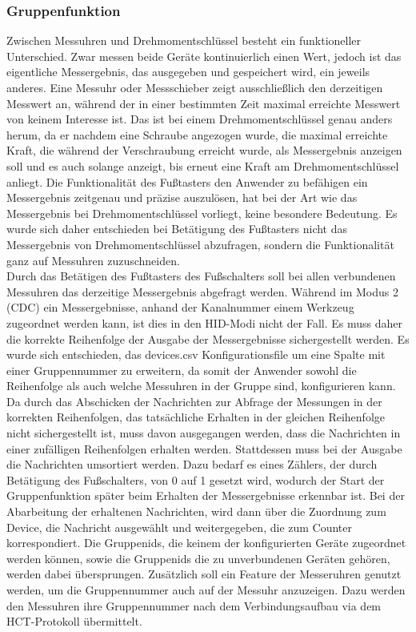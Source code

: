 \subsubsection{Gruppenfunktion}
Zwischen Messuhren und Drehmomentschlüssel besteht ein funktioneller Unterschied. Zwar messen beide Geräte kontinuierlich einen Wert, jedoch ist das eigentliche Messergebnis, das ausgegeben und gespeichert wird, ein jeweils anderes. Eine Messuhr oder Messschieber zeigt ausschließlich den derzeitigen Messwert an, während der in einer bestimmten Zeit maximal erreichte Messwert von keinem Interesse ist. Das ist bei einem Drehmomentschlüssel genau anders herum, da er nachdem eine Schraube angezogen wurde, die maximal erreichte Kraft, die während der Verschraubung erreicht wurde, als Messergebnis anzeigen soll und es auch solange anzeigt, bis erneut eine Kraft am Drehmomentschlüssel anliegt. Die Funktionalität des Fußtasters den Anwender zu befähigen ein Messergebnis zeitgenau und präzise auszulösen, hat bei der Art wie das Messergebnis bei Drehmomentschlüssel vorliegt, keine besondere Bedeutung. Es wurde sich daher entschieden bei Betätigung des Fußtasters nicht das Messergebnis von Drehmomentschlüssel abzufragen, sondern die Funktionalität ganz auf Messuhren zuzuschneiden.\\
Durch das Betätigen des Fußtasters des Fußschalters soll bei allen verbundenen Messuhren das derzeitige Messergebnis abgefragt werden. Während im Modus 2 (CDC) ein Messergebnisse, anhand der Kanalnummer einem Werkzeug zugeordnet werden kann, ist dies in den \ac{HID}-Modi nicht der Fall. Es muss daher die korrekte Reihenfolge der Ausgabe der Messergebnisse sichergestellt werden. Es wurde sich entschieden, das devices.csv Konfigurationsfile um eine Spalte mit einer Gruppennummer zu erweitern, da somit der Anwender sowohl die Reihenfolge als auch welche Messuhren in der Gruppe sind, konfigurieren kann. Da durch das Abschicken der Nachrichten zur Abfrage der Messungen in der korrekten Reihenfolgen, das tatsächliche Erhalten in der gleichen Reihenfolge nicht sichergestellt ist, muss davon ausgegangen werden, dass die Nachrichten in einer zufälligen Reihenfolgen erhalten werden. Stattdessen muss bei der Ausgabe die Nachrichten umsortiert werden. Dazu bedarf es eines Zählers, der durch Betätigung des Fußschalters, von 0 auf 1 gesetzt wird, wodurch der Start der Gruppenfunktion später beim Erhalten der Messergebnisse erkennbar ist. Bei der Abarbeitung der erhaltenen Nachrichten, wird dann über die Zuordnung zum Device, die Nachricht ausgewählt und weitergegeben, die zum Counter korrespondiert. Die Gruppenids, die keinem der konfigurierten Geräte zugeordnet werden können, sowie die Gruppenids die zu unverbundenen Geräten gehören, werden dabei übersprungen. Zusätzlich soll ein Feature der Messeruhren genutzt werden, um die Gruppennummer auch auf der Messuhr anzuzeigen. Dazu werden den Messuhren ihre Gruppennummer nach dem Verbindungsaufbau via dem \ac{HCT}-Protokoll übermittelt.\\

